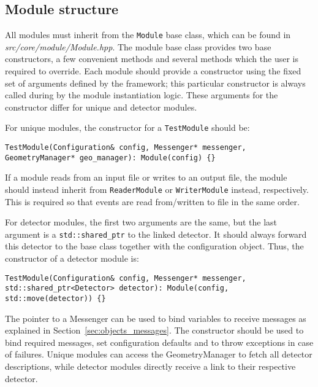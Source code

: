 \subsection{Module structure}
\label{sec:module_structure}
All modules must inherit from the \texttt{Module} base class, which can be found in \textit{src/core/module/Module.hpp}.
The module base class provides two base constructors, a few convenient methods and several methods which the user is required to override.
Each module should provide a constructor using the fixed set of arguments defined by the framework; this particular constructor is always called during by the module instantiation logic.
These arguments for the constructor differ for unique and detector modules.

For unique modules, the constructor for a \texttt{TestModule} should be:
\begin{verbatim}
TestModule(Configuration& config, Messenger* messenger, GeometryManager* geo_manager): Module(config) {}
\end{verbatim}

\begin{warning}
    If a module reads from an input file or writes to an output file, the module should instead inherit from \texttt{ReaderModule} or \texttt{WriterModule} instead, respectively.
    This is required so that events are read from/written to file in the same order.
\end{warning}

For detector modules, the first two arguments are the same, but the last argument is a \texttt{std::shared\_ptr} to the linked detector.
It should always forward this detector to the base class together with the configuration object.
Thus, the constructor of a detector module is:
\begin{verbatim}
TestModule(Configuration& config, Messenger* messenger, std::shared_ptr<Detector> detector): Module(config, std::move(detector)) {}
\end{verbatim}

The pointer to a Messenger can be used to bind variables to receive messages as explained in Section~\ref{sec:objects_messages}.
The constructor should be used to bind required messages, set configuration defaults and to throw exceptions in case of failures.
Unique modules can access the GeometryManager to fetch all detector descriptions, while detector modules directly receive a link to their respective detector.

